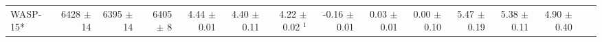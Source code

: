 \begin{sidewaystable*}[t!]
{\begin{tabular}{l r r r r r r r r r r r r r r}

WASP-15*  
&  6428  $\pm$ 14 
& 6395  $\pm$ 14 
&  6405 $\pm$ 8
&   4.44  $\pm$ 0.01  
&  4.40  $\pm$ 0.11 
&  4.22  $\pm$ 0.02 $^1$
&  -0.16  $\pm$ 0.01
& 0.03  $\pm$ 0.01 
&  0.00   $\pm$ 0.10
&  5.47  $\pm$ 0.19 
& 5.38  $\pm$ 0.11 
&  4.90   $\pm$ 0.40 \\



\end{tabular}}
\end{sidewaystable*}
